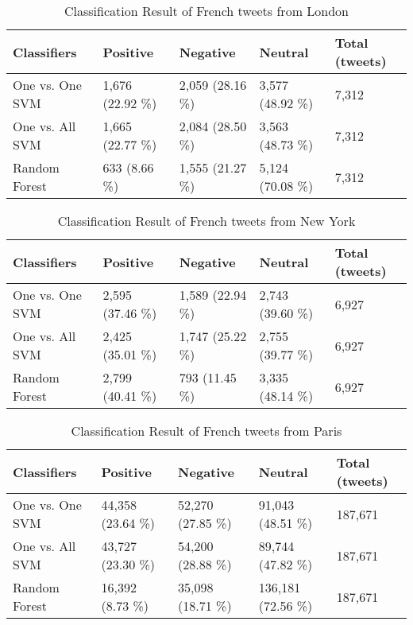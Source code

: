 \begin{table}[ht]
	\caption{Classification Result of French tweets from London}
	\begin{tabular}{|l|p{1.8cm}|p{1.8cm}|p{1.8cm}|p{1.8cm}|} \hline
	Classifiers & Positive & Negative & Neutral & Total (tweets)\\ \hline
	
One vs. One SVM & 1,676 (22.92 \%)& 2,059 (28.16 \%)& 3,577 (48.92 \%)& 7,312  \\ \hline
One vs. All SVM & 1,665 (22.77 \%)& 2,084 (28.50 \%)& 3,563 (48.73 \%)& 7,312  \\ \hline
Random Forest   & 633  (8.66 \%)& 1,555 (21.27 \%)& 5,124 (70.08 \%)& 7,312  \\ \hline

	\end{tabular}
	\label{tab:result_london_fr}
\end{table}


\begin{table}[ht]
	\caption{Classification Result of French tweets from New York}
	\begin{tabular}{|l|p{1.8cm}|p{1.8cm}|p{1.8cm}|p{1.8cm}|} \hline
	Classifiers & Positive & Negative & Neutral & Total (tweets)\\ \hline
One vs. One SVM & 2,595 (37.46 \%)& 1,589 (22.94 \%)& 2,743 (39.60 \%)& 6,927 \\ \hline
One vs. All SVM & 2,425 (35.01 \%)& 1,747 (25.22 \%)& 2,755 (39.77 \%)& 6,927 \\ \hline
Random Forest   & 2,799 (40.41 \%)& 793  (11.45 \%)& 3,335 (48.14 \%)& 6,927 \\ \hline

	\end{tabular}
	\label{tab:result_ny_fr}
\end{table}



\begin{table}[ht]
	\caption{Classification Result of French tweets from Paris}
	\begin{tabular}{|l|p{1.8cm}|p{1.8cm}|p{1.8cm}|p{1.8cm}|} \hline
	Classifiers & Positive & Negative & Neutral & Total (tweets)\\ \hline
One vs. One SVM & 44,358 (23.64 \%)& 52,270 (27.85 \%)& 91,043 (48.51 \%) & 187,671 \\ \hline
One vs. All SVM & 43,727 (23.30 \%)& 54,200 (28.88 \%)& 89,744 (47.82 \%) & 187,671 \\ \hline
Random Forest   & 16,392 (8.73 \%)& 35,098 (18.71 \%)& 136,181 (72.56 \%)& 187,671 \\ \hline
	\end{tabular}
	\label{tab:result_paris_fr}
\end{table}

